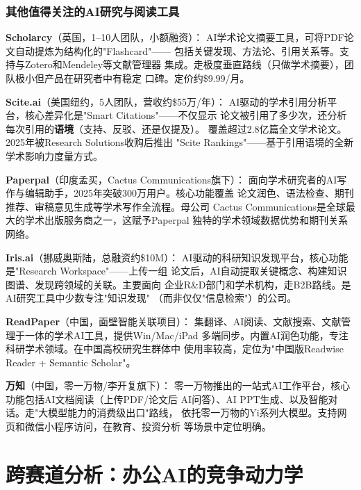 \subsubsection{其他值得关注的AI研究与阅读工具}

\textbf{Scholarcy}（英国，1--10人团队，小额融资）：
AI学术论文摘要工具，可将PDF论文自动提炼为结构化的"Flashcard"——
包括关键发现、方法论、引用关系等。支持与Zotero和Mendeley等文献管理器
集成。走极度垂直路线（只做学术摘要），团队极小但产品在研究者中有稳定
口碑。定价约\$9.99/月。

\textbf{Scite.ai}（美国纽约，5人团队，营收约\$55万/年）：
AI驱动的学术引用分析平台，核心差异化是"Smart Citations"——不仅显示
论文被引用了多少次，还分析每次引用的\textbf{语境}（支持、反驳、还是仅提及）。
覆盖超过2.8亿篇全文学术论文。2025年被Research Solutions收购后推出
"Scite Rankings"——基于引用语境的全新学术影响力度量方式。

\textbf{Paperpal}（印度孟买，Cactus Communications旗下）：
面向学术研究者的AI写作与编辑助手，2025年突破300万用户。核心功能覆盖
论文润色、语法检查、期刊推荐、审稿意见生成等学术写作全流程。母公司
Cactus Communications是全球最大的学术出版服务商之一，这赋予Paperpal
独特的学术领域数据优势和期刊关系网络。

\textbf{Iris.ai}（挪威奥斯陆，总融资约\$10M）：
AI驱动的科研知识发现平台，核心功能是"Research Workspace"——上传一组
论文后，AI自动提取关键概念、构建知识图谱、发现跨领域的关联。主要面向
企业R\&D部门和学术机构，走B2B路线。是AI研究工具中少数专注"知识发现"
（而非仅仅"信息检索"）的公司。

\textbf{ReadPaper}（中国，面壁智能关联项目）：
集翻译、AI阅读、文献搜索、文献管理于一体的学术AI工具，提供Win/Mac/iPad
多端同步。内置AI润色功能，专注科研学术领域。在中国高校研究生群体中
使用率较高，定位为"中国版Readwise Reader + Semantic Scholar"。

\textbf{万知}（中国，零一万物/李开复旗下）：
零一万物推出的一站式AI工作平台，核心功能包括AI文档阅读（上传PDF/论文后
AI问答）、AI PPT生成、以及智能对话。走"大模型能力的消费级出口"路线，
依托零一万物的Yi系列大模型。支持网页和微信小程序访问，在教育、投资分析
等场景中定位明确。



\section*{跨赛道分析：办公AI的竞争动力学}


